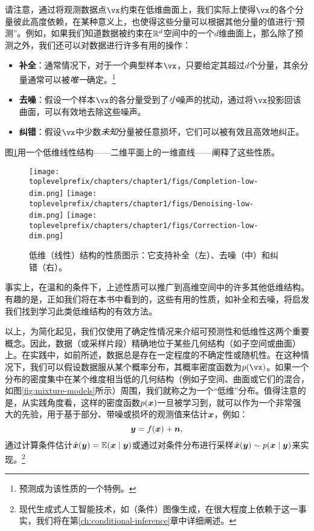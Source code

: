 \documentclass[../../book-main.tex]{subfiles}
\begin{document}
请注意，通过将观测数据点$\vx$约束在低维曲面上，我们实际上使得$\vx$的各个分量彼此高度依赖，在某种意义上，也使得这些分量可以根据其他分量的值进行“预测”。例如，如果我们知道数据被约束在$\mathbb{R}^d$空间中的一个$d$维曲面上，那么除了预测之外，我们还可以对数据进行许多有用的操作：%
\begin{itemize}
    \item \textbf{补全}：通常情况下，对于一个典型样本$\vx$，只要给定其超过$d$个分量，其余分量通常可以被{\em 唯一}确定。\footnote{预测成为该性质的一个特例。}
    \item \textbf{去噪}：假设一个样本$\vx$的各分量受到了{\em 小}噪声的扰动，通过将$\vx$投影回该曲面，可以有效地去除这些噪声。
    \item \textbf{纠错}：假设$\vx$中少数{\em 未知}分量被任意损坏，它们可以被有效且高效地纠正。
\end{itemize}
图\ref{fig:low-dim-properties}用一个低维线性结构——二维平面上的一维直线——阐释了这些性质。

\begin{figure}
    \centering
    \texttt{[image: \\toplevelprefix/chapters/chapter1/figs/Completion-low-dim.png]}     \texttt{[image: \\toplevelprefix/chapters/chapter1/figs/Denoising-low-dim.png]} \texttt{[image: \\toplevelprefix/chapters/chapter1/figs/Correction-low-dim.png]} 
    \caption{低维（线性）结构的性质图示：它支持补全（左）、去噪（中）和纠错（右）。}
    \label{fig:low-dim-properties}
\end{figure}

事实上，在温和的条件下，上述性质可以推广到高维空间中的许多其他低维结构\cite{Wright-Ma-2022}。有趣的是，正如我们将在本书中看到的，这些有用的性质，如补全和去噪，将启发我们找到学习此类低维结构的有效方法。

以上，为简化起见，我们仅使用了确定性情况来介绍可预测性和低维性这两个重要概念。因此，数据（或采样片段）精确地位于某些几何结构（如子空间或曲面）上。在实践中，如前所述，数据总是存在一定程度的不确定性或随机性。在这种情况下，我们可以假设数据服从某个概率分布，其概率密度函数为$p(\vx)$。如果一个分布的密度集中在某个维度相当低的几何结构（例如子空间、曲面或它们的混合，如图\ref{fig:mixture-models}所示）周围，我们就称之为一个“低维”分布。值得注意的是，从实践角度看，这样的密度函数$p(\bm{x})$一旦被学习到，就可以作为一个非常强大的先验，用于基于部分、带噪或损坏的观测值来估计$\bm{x}$，例如：
\begin{equation}
\bm{y} = f(\bm{x}) + \boldsymbol{n},
\end{equation}
通过计算条件估计$\hat{\bm{x}}(\bm{y}) = \mathbb{E}(\bm{x} \mid \bm{y})$或通过对条件分布进行采样$\hat{\bm{x}}(\bm{y}) \sim p(\bm{x}\mid \bm{y})$来实现。\footnote{现代生成式人工智能技术，如（条件）图像生成，在很大程度上依赖于这一事实，我们将在第\ref{ch:conditional-inference}章中详细阐述。}
\end{document}
